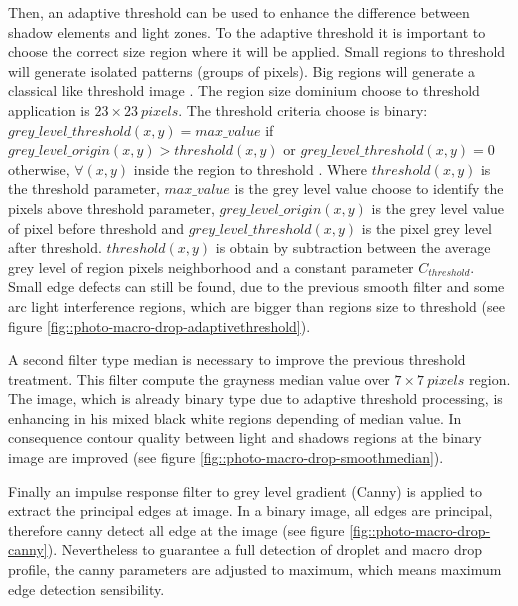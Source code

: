 \documentclass[12pt]{iopart}
\begin{document}
Then, an  adaptive threshold can be used to enhance the difference
between shadow elements and light zones. To the adaptive threshold it is important 
to choose the correct size region where it will be applied. Small regions to threshold
will generate isolated patterns (groups of pixels). Big regions will generate
a classical like threshold image \cite{SABER}. The region size dominium choose
to threshold application is $23\times 23\ pixels$. The threshold criteria 
choose is binary: $grey\_level\_threshold(x,y) = max\_value$ if $grey\_level\_origin(x,y) >  threshold(x,y)$
or $grey\_level\_threshold(x,y) = 0$ otherwise, $\forall (x,y)$ inside the region
to threshold \cite{OPENCV}. Where $threshold(x,y)$ is the threshold parameter,
 $max\_value$ is the grey level value choose to identify the pixels above
threshold parameter, $grey\_level\_origin(x,y)$ is the grey level value of pixel
 before threshold and $grey\_level\_threshold(x,y)$ is the pixel grey level after threshold.
$threshold(x,y)$ is obtain by subtraction between the average grey level of region
 pixels neighborhood and a constant parameter $C_{threshold}$.  
Small edge defects can still be found, due to the previous smooth filter and some arc 
light interference regions, which are bigger than regions size to
threshold (see figure \ref{fig::photo-macro-drop-adaptivethreshold}).  

A second filter type median is necessary to improve the previous threshold treatment. 
This filter compute the grayness median value over $7\times 7\ pixels$
region. The image, which is already binary type due to adaptive threshold processing,
 is enhancing in his mixed black white regions depending of 
 median value. In consequence contour quality between light and shadows
 regions at the binary image are improved (see figure \ref{fig::photo-macro-drop-smoothmedian}).

Finally an impulse response filter to grey level gradient (Canny) is applied to extract 
the principal edges at image. In a binary image, all edges are principal,
therefore canny detect all edge at the image (see figure \ref{fig::photo-macro-drop-canny}).
Nevertheless to guarantee a full detection of droplet and 
 macro drop profile, the canny parameters are adjusted to maximum, 
which means maximum edge detection sensibility. 
              
\end{document}
